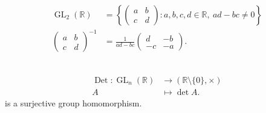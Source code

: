 \begin{example} ~\vspace*{-1.5\baselineskip}
    \begin{align*}
        \operatorname{GL}_2(\mathbb{R}) &= \left\{ \begin{pmatrix}
        a & b \\
        c & d
        \end{pmatrix} : a, b, c, d \in \mathbb{R},\ ad - bc \neq 0 \right\} \\
        \begin{pmatrix}
            a & b \\
            c & d
            \end{pmatrix}^{-1} &= \frac{1}{ad - bc} \begin{pmatrix}
        d & -b \\
        -c & -a
        \end{pmatrix}.
    \end{align*}
\end{example} 

\begin{proposition}\label{prp:9} ~\vspace*{-1.5\baselineskip}
    \begin{align*}
        \operatorname{Det} : \operatorname{GL}_n(\mathbb{R}) &\to (\mathbb{R} \setminus \{0\}, \times) \\
        A &\mapsto \det A.
    \end{align*} is a surjective group homomorphism.
\end{proposition} 

